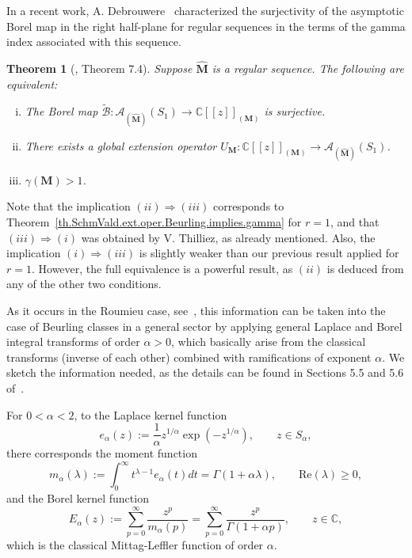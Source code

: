 \documentclass[11pt,a4paper]{article}
\theoremstyle{plain}
\newtheorem{theorem}{Theorem}[section]
\theoremstyle{definition}
\numberwithin{equation}{section}
\newcommand{\CC}{\mathbb{C}}
\newcommand{\C}{\mathbb{C}}
\newcommand{\al}{\alpha}
\newcommand{\M}{{\boldsymbol{M}}}
\newcommand{\hM}{\widehat{{\boldsymbol{M}}}}
\begin{document}
In a recent work, A. Debrouwere~\cite{momentsdebrouwere} characterized the surjectivity of the asymptotic Borel map in the right half-plane for regular sequences in the terms of the gamma index associated with this sequence.

\begin{theorem}[\cite{momentsdebrouwere}, Theorem 7.4]\label{th.ExtensOperHalfplane}
	Suppose $\hM$ is a regular sequence. The following are equivalent:
	\begin{enumerate}[(i)]
		\item The Borel map $\widetilde{\mathcal{B}}\colon \mathcal{A}_{(\hM)}(S_1)\to\CC[[z]]_{(\M)}$ is surjective.
		\item There exists a global extension operator $U_{\M}:\CC[[z]]_{(\M)}\to\mathcal{A}_{(\hM)}(S_{1})$.
		\item $\gamma(\M)>1$.
	\end{enumerate}
\end{theorem}

Note that the implication $(ii)\Rightarrow(iii)$ corresponds to Theorem~\ref{th.SchmVald.ext.oper.Beurling.implies.gamma} for $r=1$, and that $(iii)\Rightarrow(i)$ was obtained by V. Thilliez, as already mentioned. Also, the implication $(i)\Rightarrow(iii)$ is slightly weaker than our previous result applied for $r=1$. However, the full equivalence is a powerful result, as $(ii)$ is deduced from any of the other two conditions.

As it occurs in the Roumieu case, see~\cite{JimenezSanzSchindlSurjectDC}, this information can be taken into the case of Beurling classes in a general sector by applying general Laplace
and Borel integral transforms of order $\al>0$, which basically arise from the classical transforms (inverse of each other) combined with ramifications of exponent $\al$.
We sketch the information needed, as the details can be found in Sections 5.5 and 5.6 of~\cite{balserutx}.

For $0<\al<2$, to the Laplace kernel function
$$
e_{\al}(z):=\frac{1}{\al}z^{1/\al}\exp(-z^{1/\al}),\qquad z\in S_{\al},
$$
there corresponds the moment function
$$
m_{\al}(\lambda):=\int_{0}^{\infty}t^{\lambda-1}e_{\al}(t)dt=\Gamma(1+\al \lambda), \qquad\text{Re}(\lambda)\ge 0,
$$
and the Borel kernel function
$$E_{\al}(z):=\sum_{p=0}^\infty \frac{z^p}{m_{\al}(p)}=
\sum_{p=0}^\infty \frac{z^p}{\Gamma(1+\al p)},\qquad z\in\C,$$
which is the classical Mittag-Leffler function of order $\al$.
\end{document}
